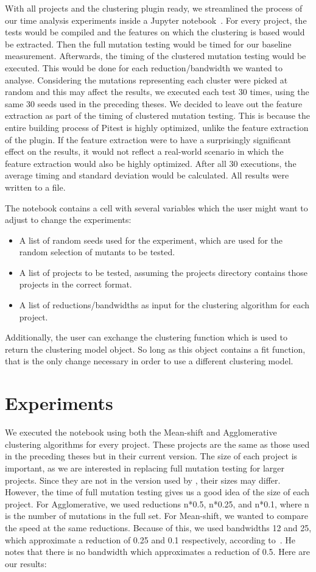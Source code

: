 \documentclass[twoside]{uva-inf-bachelor-thesis}
\begin{document}
With all projects and the clustering plugin ready, we streamlined the process of our time analysis experiments inside a Jupyter notebook~\cite{aAbdalla-repo}. For every project, the tests would be compiled and the features on which the clustering is based would be extracted. Then the full mutation testing would be timed for our baseline measurement. Afterwards, the timing of the clustered mutation testing would be executed. This would be done for each reduction/bandwidth we wanted to analyse. Considering the mutations representing each cluster were picked at random and this may affect the results, we executed each test 30 times, using the same 30 seeds used in the preceding theses. We decided to leave out the feature extraction as part of the timing of clustered mutation testing. This is because the entire building process of Pitest is highly optimized, unlike the feature extraction of the plugin. If the feature extraction were to have a surprisingly significant effect on the results, it would not reflect a real-world scenario in which the feature extraction would also be highly optimized. After all 30 executions, the average timing and standard deviation would be calculated. All results were written to a file.

The notebook contains a cell with several variables which the user might want to adjust to change the experiments:
\begin{itemize}
    \item A list of random seeds used for the experiment, which are used for the random selection of mutants to be tested.
    \item A list of projects to be tested, assuming the projects directory contains those projects in the correct format.
    \item A list of reductions/bandwidths as input for the clustering algorithm for each project.
\end{itemize}
Additionally, the user can exchange the clustering function which is used to return the clustering model object. So long as this object contains a fit function, that is the only change necessary in order to use a different clustering model.

\section{Experiments}
We executed the notebook using both the Mean-shift and Agglomerative clustering algorithms for every project. These projects are the same as those used in the preceding theses but in their current version. The size of each project is important, as we are interested in replacing full mutation testing for larger projects. Since they are not in the version used by \textcite{Basarat21}, their sizes may differ. However, the time of full mutation testing gives us a good idea of the size of each project.
For Agglomerative, we used reductions n*0.5, n*0.25, and n*0.1, where n is the number of mutations in the full set.
For Mean-shift, we wanted to compare the speed at the same reductions. Because of this, we used bandwidths 12 and 25, which approximate a reduction of 0.25 and 0.1 respectively, according to~\textcite{Mouissie22}. He notes that there is no bandwidth which approximates a reduction of 0.5. 
Here are our results:
\end{document}
